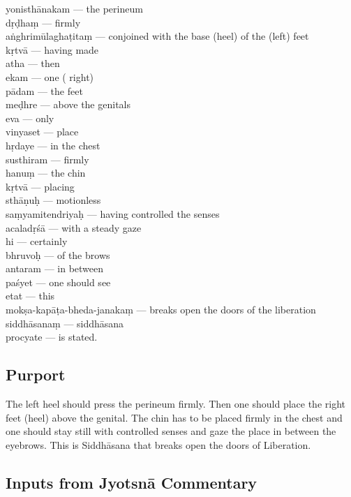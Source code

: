 \begin{multicols}{2}
yonisthānakam --- the perineum \\
dṛḍhaṃ --- firmly  \\
aṅghrimūlaghaṭitaṃ --- conjoined with the base (heel) of the (left) feet  \\
kṛtvā --- having made \\
atha --- then\\
ekam --- one ( right)  \\
pādam --- the feet \\
meḍhre --- above the genitals \\
eva --- only \\
vinyaset --- place \\
hṛdaye --- in the chest \\
susthiram --- firmly \\
hanuṃ --- the chin \\
kṛtvā --- placing \\
sthāṇuḥ --- motionless\\
saṃyamitendriyaḥ --- having controlled the senses  \\
acaladṛśā  --- with a  steady gaze  \\
hi --- certainly \\
bhruvoḥ --- of the brows  \\
antaram  --- in between \\
paśyet --- one should see \\
etat --- this  \\
mokṣa-kapāṭa-bheda-janakaṃ --- breaks open the doors of the liberation \\
siddhāsanaṃ --- siddhāsana \\
procyate --- is stated. 
\end{multicols}

\subsection*{Purport}

The left heel should press the perineum firmly. Then one should place the right feet (heel) above the genital.  The chin has to be placed firmly in the chest and one should stay still with controlled senses and gaze the place in between the eyebrows. This is Siddhāsana that breaks open the doors of Liberation.

\subsection*{Inputs from Jyotsnā Commentary}

